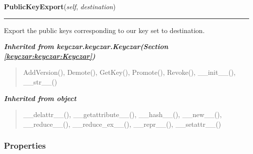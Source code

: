     \label{keyczar:keyczar:GenericKeyczar:PublicKeyExport}

    \vspace{0.5ex}

\hspace{.8\funcindent}\begin{boxedminipage}{\funcwidth}

    \raggedright \textbf{PublicKeyExport}(\textit{self}, \textit{destination})

    \vspace{-1.5ex}

    \rule{\textwidth}{0.5\fboxrule}
\setlength{\parskip}{2ex}
    Export the public keys corresponding to our key set to destination.

\setlength{\parskip}{1ex}
    \end{boxedminipage}


\large{\textbf{\textit{Inherited from keyczar.keyczar.Keyczar\textit{(Section \ref{keyczar:keyczar:Keyczar})}}}}

\begin{quote}
AddVersion(), Demote(), GetKey(), Promote(), Revoke(), \_\_init\_\_(), \_\_str\_\_()
\end{quote}

\large{\textbf{\textit{Inherited from object}}}

\begin{quote}
\_\_delattr\_\_(), \_\_getattribute\_\_(), \_\_hash\_\_(), \_\_new\_\_(), \_\_reduce\_\_(), \_\_reduce\_ex\_\_(), \_\_repr\_\_(), \_\_setattr\_\_()
\end{quote}


  \subsubsection{Properties}

